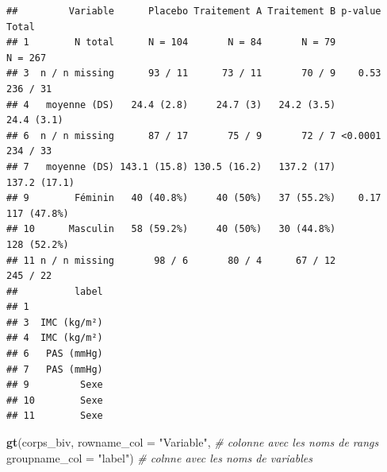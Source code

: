 \documentclass[
]{book}
\newenvironment{Shaded}{\begin{snugshade}}{\end{snugshade}}
\newcommand{\AttributeTok}[1]{\textcolor[rgb]{0.13,0.29,0.53}{#1}}
\newcommand{\CommentTok}[1]{\textcolor[rgb]{0.56,0.35,0.01}{\textit{#1}}}
\newcommand{\FunctionTok}[1]{\textcolor[rgb]{0.13,0.29,0.53}{\textbf{#1}}}
\newcommand{\NormalTok}[1]{#1}
\newcommand{\StringTok}[1]{\textcolor[rgb]{0.31,0.60,0.02}{#1}}
\begin{document}
\begin{verbatim}
##         Variable      Placebo Traitement A Traitement B p-value        Total
## 1        N total      N = 104       N = 84       N = 79              N = 267
## 3  n / n missing      93 / 11      73 / 11       70 / 9    0.53     236 / 31
## 4   moyenne (DS)   24.4 (2.8)     24.7 (3)   24.2 (3.5)           24.4 (3.1)
## 6  n / n missing      87 / 17       75 / 9       72 / 7 <0.0001     234 / 33
## 7   moyenne (DS) 143.1 (15.8) 130.5 (16.2)   137.2 (17)         137.2 (17.1)
## 9        Féminin   40 (40.8%)     40 (50%)   37 (55.2%)    0.17  117 (47.8%)
## 10      Masculin   58 (59.2%)     40 (50%)   30 (44.8%)          128 (52.2%)
## 11 n / n missing       98 / 6       80 / 4      67 / 12             245 / 22
##          label
## 1             
## 3  IMC (kg/m²)
## 4  IMC (kg/m²)
## 6   PAS (mmHg)
## 7   PAS (mmHg)
## 9         Sexe
## 10        Sexe
## 11        Sexe
\end{verbatim}

\begin{Shaded}
\begin{Highlighting}[]
\FunctionTok{gt}\NormalTok{(corps\_biv, }
   \AttributeTok{rowname\_col =} \StringTok{"Variable"}\NormalTok{, }\CommentTok{\# colonne avec les noms de rangs}
   \AttributeTok{groupname\_col =} \StringTok{"label"}\NormalTok{)  }\CommentTok{\# colnne avec les noms de variables}
\end{Highlighting}
\end{Shaded}
\end{document}
